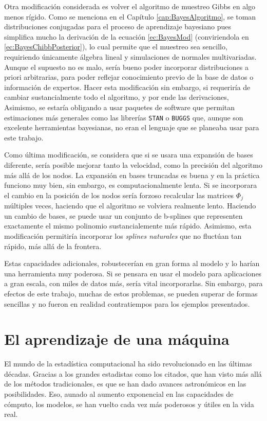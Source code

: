 \documentclass[../Main/Main.tex]{subfiles}
\begin{document}
Otra modificación considerada es volver el algoritmo de muestreo Gibbs en algo menos rígido. Como se menciona en el Capítulo \ref{cap:BayesAlgoritmo}, se toman distribuciones conjugadas para el proceso de aprendizaje bayesiano pues simplifica mucho la derivación de la ecuación \ref{ec:BayesMod} (conviriendola en \ref{ec:BayesChibbPosterior}), lo cual permite que el muestreo sea sencillo, requiriendo únicamente álgebra lineal y simulaciones de normales multivariadas. Aunque el supuesto no es malo, sería bueno poder incorporar distribuciones a priori arbitrarias, para poder reflejar conocimiento previo de la base de datos o información de expertos. Hacer esta modificación sin embargo, si requeriría de cambiar sustancialmente todo el algoritmo, y por ende las derivaciones, Asimismo, se estaría obligando a usar paquetes de software que permitan estimaciones más generales como las librerías \verb|STAN| o \verb|BUGGS| que, aunque son excelente herramientas bayesianas, no eran el lenguaje que se planeaba usar para este trabajo.

Como última modificación, se considera que si se usara una expansión de bases diferente, sería posible mejorar tanto la velocidad, como la precisión del algoritmo más allá de los nodos. La expansión en bases truncadas es buena y en la práctica funciono muy bien, sin embargo, es computacionalmente lenta. Si se incorporara el cambio en la posición de los nodos sería forzoso recalcular las matrices $\Phi_j$ múltiples veces, haciendo que el algoritmo se volviera realmente lento. Haciendo un cambio de bases, se puede usar un conjunto de b-splines que representen exactamente el mismo polinomio sustancialemente más rápido. Asimismo, esta modificación permitiría incorporar los \textit{splines naturales} que no fluctúan tan rápido, más allá de la frontera. 

Estas capacidades adicionales, robustecerían en gran forma al modelo y lo harían una herramienta muy poderosa. Si se pensara en usar el modelo para aplicaciones a gran escala, con miles de datos más, sería vital incorporarlas. Sin embargo, para efectos de este trabajo, muchas de estos problemas, se pueden superar de formas sencillas y no fueron en realidad contratiempos para los ejemplos presentados. 

\section{El aprendizaje de una máquina}
El mundo de la estadística computacional ha sido revolucionado en las últimas décadas. Gracias a los grandes estadistas como los citados, que han visto más allá de los métodos tradicionales, es que se han dado avances astronómicos en las posibilidades. Eso, aunado al aumento exponencial en las capacidades de cómputo, los modelos, se han vuelto cada vez más poderosos y útiles en la vida real.
\end{document}
